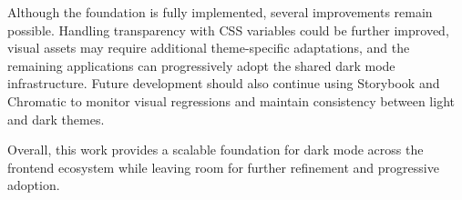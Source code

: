 Although the foundation is fully implemented, several improvements remain possible. Handling transparency with CSS variables could be further improved, visual assets may require additional theme-specific adaptations, and the remaining applications can progressively adopt the shared dark mode infrastructure. Future development should also continue using Storybook and Chromatic to monitor visual regressions and maintain consistency between light and dark themes.

Overall, this work provides a scalable foundation for dark mode across the frontend ecosystem while leaving room for further refinement and progressive adoption.

\clearpage
